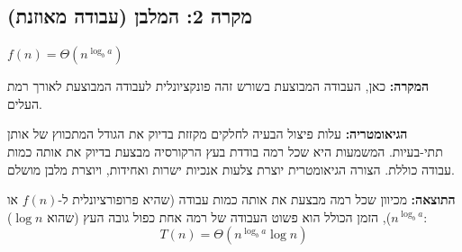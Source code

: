 \documentclass[11pt, a4paper]{article}
\begin{document}
\vspace{0.5cm}
\begin{center}
\end{center}
\vspace{1cm}
\newpage
\subsection*{מקרה 2: המלבן (עבודה מאוזנת)}

\begin{tcolorbox}[colback=accent3!10, colframe=accent3, title=\textbf{התנאי}]
$f(n) = \Theta(n^{\log_b a})$
\end{tcolorbox}
\textbf{המקרה:} כאן, העבודה המבוצעת בשורש זהה פונקציונלית לעבודה המבוצעת לאורך רמת העלים.

\textbf{הגיאומטריה:} עלות פיצול הבעיה לחלקים מקזזת בדיוק את הגודל המתכווץ של אותן תתי-בעיות. המשמעות היא שכל רמה בודדת בעץ הרקורסיה מבצעת בדיוק את אותה כמות עבודה כוללת. הצורה הגיאומטרית יוצרת צלעות אנכיות ישרות ואחידות, ויוצרת מלבן מושלם.

\textbf{התוצאה:} מכיוון שכל רמה מבצעת את אותה כמות עבודה (שהיא פרופורציונלית ל-$f(n)$ או $n^{\log_b a}$), הזמן הכולל הוא פשוט העבודה של רמה אחת כפול גובה העץ (שהוא $\log n$):
\begin{equation*}
    T(n) = \Theta(n^{\log_b a} \log n)
\end{equation*}
\end{document}
